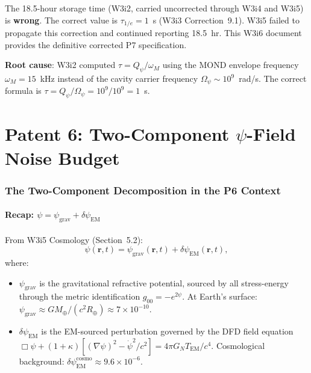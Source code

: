 \documentclass[11pt]{article}
\theoremstyle{definition}
\theoremstyle{remark}
\newcommand{\ee}[1]{\times10^{#1}}
\newcommand{\Qpsi}{Q_\psi}
\newcommand{\Opsi}{\Omega_\psi}
\newcommand{\psigrav}{\psi_{\mathrm{grav}}}
\newcommand{\dpsiem}{\delta\psi_{\mathrm{EM}}}
\newcommand{\GN}{G_N}
\begin{document}
\begin{tcolorbox}[colback=red!5!white, colframe=red!60!black,
  title=\textbf{CRITICAL: P7 Storage Time Correction --- Final Propagation}]
The 18.5-hour storage time (W3i2, carried uncorrected through W3i4 and W3i5)
is \textbf{wrong}. The correct value is $\tau_{1/e} = 1$~s (W3i3 Correction~9.1).
W3i5 failed to propagate this correction and continued reporting 18.5~hr.
This W3i6 document provides the definitive corrected P7 specification.

\textbf{Root cause}: W3i2 computed $\tau = \Qpsi/\omega_M$ using the MOND
envelope frequency $\omega_M = 15$~kHz instead of the cavity carrier
frequency $\Opsi \sim 10^9$~rad/s. The correct formula is
$\tau = \Qpsi/\Opsi = 10^9/10^9 = 1$~s.
\end{tcolorbox}

\part{Patent 6: Two-Component $\psi$-Field Noise Budget}
\label{part:P6}

\section{The Two-Component Decomposition in the P6 Context}
\label{sec:P6-decomp}

\subsection{Recap: $\psi = \psigrav + \dpsiem$}

From W3i5 Cosmology (Section~5.2):
\begin{equation}
\psi(\mathbf{r},t) = \psigrav(\mathbf{r},t) + \dpsiem(\mathbf{r},t),
\label{eq:two-component}
\end{equation}
where:
\begin{itemize}[nosep]
\item $\psigrav$ is the gravitational refractive potential, sourced by all
  stress-energy through the metric identification $g_{00} = -e^{2\psi}$.
  At Earth's surface: $\psigrav \approx GM_\oplus/(c^2 R_\oplus)
  \approx 7\ee{-10}$.
\item $\dpsiem$ is the EM-sourced perturbation governed by the DFD field
  equation $\Box\psi + (1+\kappa)[(\nabla\psi)^2 - \dot\psi^2/c^2]
  = 4\pi\GN T_{\mathrm{EM}}/c^4$.
  Cosmological background: $\dpsiem^{\mathrm{cosmo}} \approx 9.6\ee{-6}$.
\end{itemize}
\end{document}
